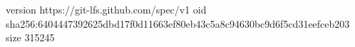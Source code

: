 version https://git-lfs.github.com/spec/v1
oid sha256:6404447392625dbd17f0d11663ef80eb43c5a8c94630bc9d6f5cd31eefceb203
size 315245
